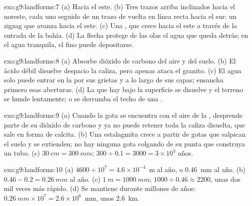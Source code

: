 \begin{solution}{exo:g9:landforms:7}
(a) Hacia el este. (b) Tres trazos  arriba inclinados hacia el
noreste, cada uno seguido de un trazo de vuelta en línea recta hacia el
sur: un zigzag que avanza hacia el este. (c) Una , que crece
hacia el este a través de la entrada de la bahía. (d) La flecha protege de
las olas el agua que queda detrás; en el agua tranquila, el  fino
puede depositarse.
\end{solution}

\begin{solution}{exo:g9:landforms:8}
(a) Absorbe dióxido de carbono del aire y del suelo. (b) El ácido débil
disuelve despacio la caliza, pero apenas ataca el granito. (c) El agua
solo puede entrar en la  por sus grietas y a lo largo de sus capas;
ensancha primero esas aberturas. (d) La  que hay bajo la superficie se
disuelve y el terreno se hunde lentamente; o se derrumba el techo de una
.
\end{solution}

\begin{solution}{exo:g9:landforms:9}
(a) Cuando la gota se encuentra con el aire de la , desprende parte de
su dióxido de carbono y ya no puede retener toda la caliza disuelta, que
sale en forma de calcita. (b) Una estalagmita crece a partir de gotas que
salpican el suelo y se extienden; no hay ninguna gota colgando de su punta
que construya un tubo. (c) $\qty{30}{cm} = \qty{300}{mm}$; $300 \div 0.1 = 3000 = 3 \times 10^3$
años.
\end{solution}

\begin{solution}{exo:g9:landforms:10}
(a) $4600 \div 10^7 = 4.6 \times 10^{-4}$~m al año, o \qty{0.46}{mm} al
año. (b) $0.46 - 0.2 = \qty{0.26}{mm}$ al año. (c) $\qty{1}{m} =
\qty{1000}{mm}$; $1000 \div 0.46 \approx 2200$, unas dos mil veces más
rápido. (d) Se mantiene durante millones de años: $\qty{0.26}{mm} \times
10^7 = 2.6 \times 10^6$~mm, unos \qty{2.6}{km}.
\end{solution}

